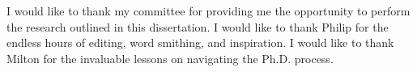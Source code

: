 \begin{acknowledgments}
    I would like to thank my committee for providing me the opportunity to perform the research outlined in this dissertation. I would like to thank Philip for the endless hours of editing, word smithing, and inspiration. I would like to thank Milton for the invaluable lessons on navigating the Ph.D. process.
\end{acknowledgments}
